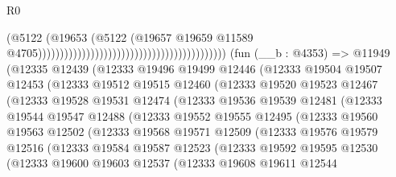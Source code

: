 \begin{lexlean}{R0}
\begin{coremodule}
                                                                                  (@5122
                                                                                    (@19653
                                                                                      (@5122
                                                                                        (@19657
                                                                                          @19659
                                                                                          @11589
                                                                                          @4705)))))))))))))))))))))))))))))))))))))))))))
    (fun (__b : @4353) =>
    @11949
      (@12335
        @12439
        (@12333
          @19496
          @19499
          @12446
          (@12333
            @19504
            @19507
            @12453
            (@12333
              @19512
              @19515
              @12460
              (@12333
                @19520
                @19523
                @12467
                (@12333
                  @19528
                  @19531
                  @12474
                  (@12333
                    @19536
                    @19539
                    @12481
                    (@12333
                      @19544
                      @19547
                      @12488
                      (@12333
                        @19552
                        @19555
                        @12495
                        (@12333
                          @19560
                          @19563
                          @12502
                          (@12333
                            @19568
                            @19571
                            @12509
                            (@12333
                              @19576
                              @19579
                              @12516
                              (@12333
                                @19584
                                @19587
                                @12523
                                (@12333
                                  @19592
                                  @19595
                                  @12530
                                  (@12333
                                    @19600
                                    @19603
                                    @12537
                                    (@12333
                                      @19608
                                      @19611
                                      @12544

\end{coremodule}
\end{lexlean}
